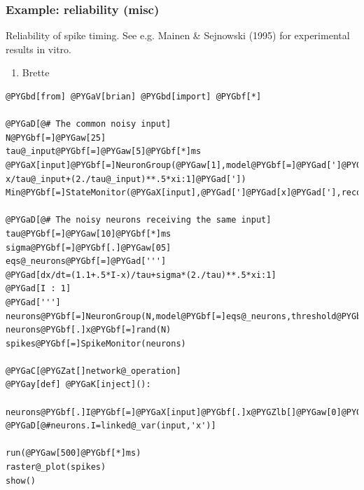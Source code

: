\documentclass[letterpaper,10pt,english]{manual}
\begin{document}
\resetcurrentobjects
\hypertarget{--doc-examples-misc_reliability}{}

\hypertarget{index-82}{}\subsubsection{Example: reliability (misc)}

Reliability of spike timing.
See e.g. Mainen \& Sejnowski (1995) for experimental results in vitro.
\begin{enumerate}
\item {} 
Brette

\end{enumerate}

\begin{Verbatim}[commandchars=@\[\]]
@PYGbd[from] @PYGaV[brian] @PYGbd[import] @PYGbf[*]

@PYGaD[@# The common noisy input]
N@PYGbf[=]@PYGaw[25]
tau@_input@PYGbf[=]@PYGaw[5]@PYGbf[*]ms
@PYGaX[input]@PYGbf[=]NeuronGroup(@PYGaw[1],model@PYGbf[=]@PYGad[']@PYGad[dx/dt=-x/tau@_input+(2./tau@_input)**.5*xi:1]@PYGad['])
Min@PYGbf[=]StateMonitor(@PYGaX[input],@PYGad[']@PYGad[x]@PYGad['],record@PYGbf[=]@PYGaA[True])

@PYGaD[@# The noisy neurons receiving the same input]
tau@PYGbf[=]@PYGaw[10]@PYGbf[*]ms
sigma@PYGbf[=]@PYGbf[.]@PYGaw[05]
eqs@_neurons@PYGbf[=]@PYGad[''']
@PYGad[dx/dt=(1.1+.5*I-x)/tau+sigma*(2./tau)**.5*xi:1]
@PYGad[I : 1]
@PYGad[''']
neurons@PYGbf[=]NeuronGroup(N,model@PYGbf[=]eqs@_neurons,threshold@PYGbf[=]@PYGaw[1],reset@PYGbf[=]@PYGaw[0],refractory@PYGbf[=]@PYGaw[5]@PYGbf[*]ms)
neurons@PYGbf[.]x@PYGbf[=]rand(N)
spikes@PYGbf[=]SpikeMonitor(neurons)

@PYGaC[@PYGZat[]network@_operation]
@PYGay[def] @PYGaK[inject]():
    neurons@PYGbf[.]I@PYGbf[=]@PYGaX[input]@PYGbf[.]x@PYGZlb[]@PYGaw[0]@PYGZrb[]
@PYGaD[@#neurons.I=linked@_var(input,'x')]

run(@PYGaw[500]@PYGbf[*]ms)
raster@_plot(spikes)
show()
\end{Verbatim}

\resetcurrentobjects
\hypertarget{--doc-examples-misc_ring}{}
\end{document}
